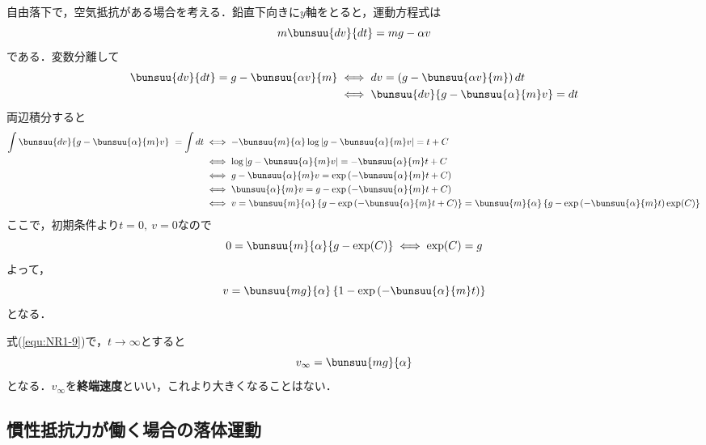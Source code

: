 自由落下で，空気抵抗がある場合を考える．鉛直下向きに$y$軸をとると，運動方程式は
\begin{equation}
	m\bunsuu{dv}{dt} = mg - \alpha v
\end{equation}
である．変数分離して
\begin{align*}
	\bunsuu{dv}{dt} = g - \bunsuu{\alpha v}{m} &
	\iff dv = \left(g - \bunsuu{\alpha v}{m}\right)dt\\
	& \iff \bunsuu{dv}{g - \bunsuu{\alpha}{m}v} = dt
\end{align*}
両辺積分すると
\begin{align*}
	\int \bunsuu{dv}{g - \bunsuu{\alpha}{m}v}\ = \int dt
	&\iff -\bunsuu{m}{\alpha}\log\left|g - \bunsuu{\alpha}{m}v\right| = t + C\\
	&\iff \log\left|g - \bunsuu{\alpha}{m}v\right| = -\bunsuu{\alpha}{m}t + C\\
	&\iff g - \bunsuu{\alpha}{m}v = \exp\left(-\bunsuu{\alpha}{m}t + C\right)\\
	&\iff \bunsuu{\alpha}{m} v = g - \exp\left(-\bunsuu{\alpha}{m}t + C\right)\\
	&\iff v = \bunsuu{m}{\alpha}\left\{g - \exp\left(-\bunsuu{\alpha}{m}t + C\right)\right\} = \bunsuu{m}{\alpha}\left\{g - \exp\left(-\bunsuu{\alpha}{m}t\right)\exp(C)\right\}
\end{align*}
ここで，初期条件より$t = 0,\ v = 0$なので
\begin{equation*}
	0 = \bunsuu{m}{\alpha}\{g - \exp(C)\} \iff \exp(C) = g
\end{equation*}
よって，
\begin{equation}
	v = \bunsuu{mg}{\alpha}\left\{1 - \exp\left(-\bunsuu{\alpha}{m}t\right)\right\} \label{equ:NR1-9}
\end{equation}
となる．

式(\ref{equ:NR1-9})で，$t \to \infty$とすると
\begin{equation}
	v_{\infty} = \bunsuu{mg}{\alpha}
\end{equation}
となる．$v_{\infty}$を\textbf{終端速度}といい，これより大きくなることはない．



\subsection{慣性抵抗力が働く場合の落体運動}

